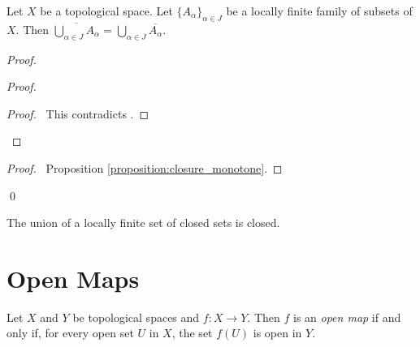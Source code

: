 \begin{lemma}
    Let $X$ be a topological space. Let $\{A_\alpha\}_{\alpha \in J}$ be a locally finite family of subsets of $X$. 
    Then $\overline{\bigcup_{\alpha \in J} A_\alpha} = \bigcup_{\alpha \in J} \overline{A_\alpha}$.
\end{lemma}

\begin{proof}
    \pf
    \begin{proof}
        \qedstep
        \begin{proof}
            \pf\ This contradicts .
        \end{proof}
    \end{proof}
    \begin{proof}
        \pf\ Proposition \ref{proposition:closure_monotone}.
    \end{proof}
    \qed
\end{proof}

\begin{corollary}
    \label{corollary:union_locally_finite_closed}
    The union of a locally finite set of closed sets is closed.
\end{corollary}

\section{Open Maps}

\begin{definition}
    Let $X$ and $Y$ be topological spaces and $f : X \rightarrow Y$. Then $f$ is an \emph{open map} if and
    only if, for every open set $U$ in $X$, the set $f(U)$ is open in $Y$.
\end{definition}

